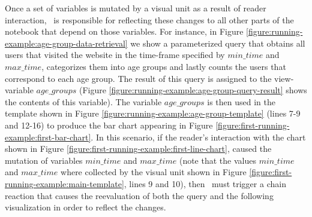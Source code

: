 Once a set of variables is mutated by a visual unit as a result of reader interaction, \projname\ is responsible for reflecting these changes to all other parts of the notebook that depend on those variables. For instance, in Figure \ref{figure:running-example:age-group-data-retrieval} we show a parameterized query that obtains all users that visited the website in the time-frame specified by $min\_time$ and $max\_time$, categorizes them into age groups and lastly counts the users that correspond to each age group. The result of this query is assigned to the view-variable $age\_groups$ (Figure \ref{figure:running-example:age-group-query-result} shows the contents of this variable). The variable $age\_groups$ is then used in the template shown in Figure \ref{figure:running-example:age-group-template} (lines 7-9 and 12-16) to produce the bar chart appearing in Figure \ref{figure:first-running-example:first-bar-chart}. In this scenario, if the reader's interaction with the chart shown in Figure \ref{figure:first-running-example:first-line-chart}, caused the mutation of variables $min\_time$ and $max\_time$ (note that the values $min\_time$ and $max\_time$ where collected by the visual unit shown in Figure \ref{figure:first-running-example:main-template}, lines 9 and 10), then \projname\ must trigger a chain reaction that causes the reevaluation of both the query and the following visualization in order to reflect the changes. 




